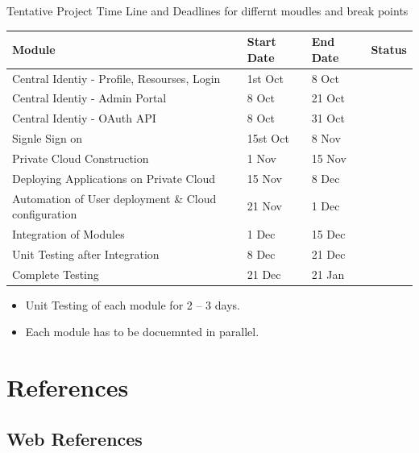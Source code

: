 \documentclass[12pt]{report}
\begin{document}
	Tentative Project Time Line and Deadlines for differnt moudles and break points
	
	\begin{table}[H]
		
		\begin{tabular}{ | l | l | l | l |}
			\hline 
			\textbf{Module} & \textbf{Start Date} & \textbf{End Date} & \textbf{Status} \\
			\hline 
			Central Identiy - Profile, Resourses, Login  & 1st Oct & 8 Oct & \\
			\hline
			Central Identiy - Admin Portal & 8 Oct & 21 Oct & \\
			\hline
			Central Identiy - OAuth API & 8 Oct & 31 Oct & \\
			\hline
			Signle Sign on & 15st Oct & 8 Nov & \\
			\hline
			Private Cloud Construction & 1 Nov & 15 Nov  & \\
			\hline 
			Deploying Applications on Private Cloud & 15 Nov & 8 Dec & \\
			\hline 
			Automation of User deployment \& Cloud configuration & 21 Nov & 1 Dec & \\
			\hline 
			Integration of Modules & 1 Dec & 15 Dec & \\
			\hline
			Unit Testing after Integration & 8 Dec & 21 Dec  & \\
			\hline
			Complete Testing & 21 Dec & 21 Jan &  \\
				
			\hline 
		\end{tabular}
		
	\end{table}
	
	\begin{itemize}
		\item Unit Testing of each module for 2 -- 3 days.
		\item Each module has to be docuemnted in parallel.
	\end{itemize}
	
\chapter{References}

\section{Web References}
\end{document}
